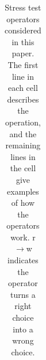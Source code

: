 \begin{table}[th!]
\begin{tabular}{l|l}

                \bottomrule
        \end{tabular}
        \caption{Stress test operators considered in this paper.
The first line in each cell describes the operation, and the remaining lines in
the cell give examples of how the operators work.
r$\rightarrow$w indicates the operator turns a right choice into a wrong choice.}
        \label{table:proxyop}
\end{table}




